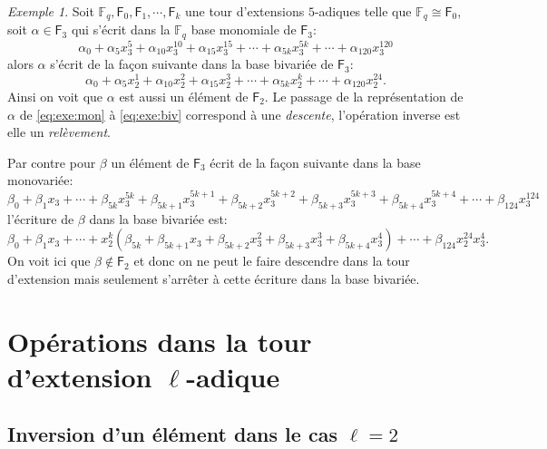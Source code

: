 \documentclass[10pt,a4paper]{book}
\theoremstyle{plain}
\theoremstyle{definition}
\theoremstyle{definition}
\theoremstyle{definition}
\theoremstyle{definition}
\theoremstyle{remark}
\theoremstyle{remark}
\newtheorem{exe}[thm]{Exemple}
\theoremstyle{definition}
\begin{document}
\begin{exe}
Soit $\mathbb{F}_q, \mathsf{F}_0, \mathsf{F}_1, \cdots, \mathsf{F}_k$ une tour d'extensions $5$-adiques telle que $\mathbb{F}_q \cong \mathsf{F}_0$, soit $\alpha \in \mathsf{F}_3$ qui s'écrit dans la $\mathbb{F}_q$ base monomiale de $\mathsf{F}_3$:
\begin{equation}
\label{eq:exe:mon}
\alpha_0 + \alpha_5x_3^5+ \alpha_{10}x_3^{10} + \alpha_{15}x_3^{15} + \cdots + \alpha_{5k}x_3^{5k} + \cdots + \alpha_{120}x_3^{120} 
\end{equation} 
alors $\alpha$ s'écrit de la façon suivante dans la base bivariée de $\mathsf{F}_3$:
\begin{equation}
\label{eq:exe:biv}
\alpha_0 + \alpha_5x_2^1+ \alpha_{10}x_2^{2} + \alpha_{15}x_2^{3} + \cdots + \alpha_{5k}x_2^{k} + \cdots + \alpha_{120}x_2^{24}. 
\end{equation} 
 Ainsi on voit que $\alpha$ est aussi un élément de $\mathsf{F}_2$. Le passage de la représentation de $\alpha$ de \eqref{eq:exe:mon} à \eqref{eq:exe:biv} correspond à une \emph{descente}, l'opération inverse est elle un \emph{relèvement}.
 
 Par contre pour $\beta$ un élément de $\mathsf{F}_3$ écrit de la façon suivante dans la base monovariée:
 \begin{equation}
 \beta_0 + \beta_1 x_3+ \cdots +\beta_{5k}x_3^{5k} + \beta_{5k+1}x_3^{5k+1}+\beta_{5k+2}x_3^{5k+2}+ \beta_{5k+3}x_3^{5k+3}+ \beta_{5k+4}x_3^{5k+4}+ \cdots + \beta_{124}x_3^{124}
 \end{equation}
l'écriture de $\beta$ dans la base bivariée est: 
 \begin{equation}
  \beta_0 + \beta_1 x_3+ \cdots + x_2^{k}(\beta_{5k}+\beta_{5k+1} x_3 + \beta_{5k+2} x_3^2 + \beta_{5k+3} x_3^3 + \beta_{5k+4}x_3^4)+ \cdots + \beta_{124}x_2^{24}x_3^{4}.
 \end{equation}
 On voit ici que $\beta \notin \mathsf{F}_2$ et donc on ne peut le faire descendre dans la tour d'extension mais seulement s'arrêter à cette écriture dans la base bivariée.
\end{exe}

\section{Opérations dans la tour d'extension $\ell$-adique}

\subsection*{Inversion d'un élément dans le cas $\ell=2$}
\end{document}
